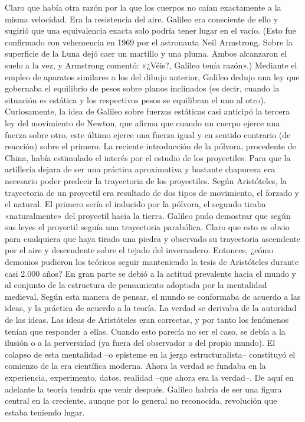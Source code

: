 \documentclass[letterpaper, 10pt, journal]{IEEEtran}
\begin{document}
\newline
Claro que había otra razón por la que los cuerpos no caían exactamente a la misma velocidad. Era la resistencia del aire. Galileo era consciente de ello y sugirió que una equivalencia exacta solo podría tener lugar en el vacío. (Esto fue confirmado con vehemencia en 1969 por el astronauta Neil Armstrong. Sobre la superficie de la Luna dejó caer un martillo y una pluma. Ambos alcanzaron el suelo a la vez, y Armstrong comentó: «¿Véis?, Galileo tenía razón».)
\newline
Mediante el empleo de aparatos similares a los del dibujo anterior, Galileo dedujo una ley que gobernaba el equilibrio de pesos sobre planos inclinados (es decir, cuando la situación es estática y los respectivos pesos se equilibran el uno al otro). Curiosamente, la idea de Galileo sobre fuerzas estáticas casi anticipó la tercera ley del movimiento de Newton, que afirma que cuando un cuerpo ejerce una fuerza sobre otro, este último ejerce una fuerza igual y en sentido contrario (de reacción) sobre el primero.
\newline
La reciente introducción de la pólvora, procedente de China, había estimulado el interés por el estudio de los proyectiles. Para que la artillería dejara de ser una práctica aproximativa y bastante chapucera era necesario poder predecir la trayectoria de los proyectiles. Según Aristóteles, la trayectoria de un proyectil era resultado de dos tipos de movimiento, el forzado y el natural. El primero sería el inducido por la pólvora, el segundo tiraba «naturalmente» del proyectil hacia la tierra.
\newline  
Galileo pudo demostrar que según sus leyes el proyectil seguía una trayectoria parabólica.
\newline  
Claro que esto es obvio para cualquiera que haya tirado una piedra y observado su trayectoria ascendente por el aire y descendente sobre el tejado del invernadero. Entonces, ¿cómo demonios pudieron los teóricos seguir manteniendo la tesis de Aristóteles durante casi 2.000 años? En gran parte se debió a la actitud prevalente hacia el mundo y al conjunto de la estructura de pensamiento adoptada por la mentalidad medieval. Según esta manera de pensar, el mundo se conformaba de acuerdo a las ideas, y la práctica de acuerdo a la teoría. La verdad se derivaba de la autoridad de las ideas. Las ideas de Aristóteles eran correctas, y por tanto los fenómenos tenían que responder a ellas. Cuando esto parecía no ser el caso, se debía a la ilusión o a la perversidad (ya fuera del observador o del propio mundo). El colapso de esta mentalidad –o episteme en la jerga estructuralista– constituyó el comienzo de la era científica moderna. Ahora la verdad se fundaba en la experiencia, experimento, datos, realidad –que ahora era la verdad–. De aquí en adelante la teoría tendría que venir después. Galileo habría de ser una figura central en la creciente, aunque por lo general no reconocida, revolución que estaba teniendo lugar.
\end{document}
